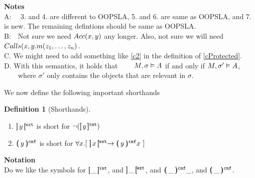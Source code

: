 \documentclass[11pt]{article} %
\theoremstyle{definition}
\newtheorem{definition}{Definition}[section]
\begin{document}
\noindent
\textbf{Notes} 
\\
A: \ \ 3. and 4. are different to OOPSLA, 5. and 6. are same as OOPSLA, and 7. is new. The remaining defintions should be same as OOPSLA.
\\
B:\ \  Not sure we need ${Acc(x,y)}$ any longer. 
 Also, not sure we will need ${Calls(x,y.m (z_1, \ldots, z_n)}$. 
\\
C. We might need to add something like \ref{c2}  in the definition of \ref{cProtected}.
\\
 D. With this semantics, it holds that \ \ \ \ $M , \sigma \vDash A$ if and only if $M , \sigma' \vDash A$, \ \ \ \ where $\sigma'$ only contains the objects that are relevant in $\sigma$.
 

 We now define the following  important shorthands
 \begin{definition}[Shorthands]
 ~
 
\begin{enumerate}
\item
$]\!\!]\, y\, [\!\![^{{\texttt{ext}}}$ is short for  $\neg([\!\![ \,y\, ]\!\!]^{{\texttt{int}}})$
\item
${ (\!\!( \, y \, )\!\!)^{{\texttt{cnf}}} }$  is short for ${\all{x}{\ \external x  \rightarrow  {}{\protectedFrom{y} {x}}\ }}$
\end{enumerate}
\end{definition}
 


 
\noindent
\textbf{Notation} 
\\
Do we like the   symbols for $[\!\![ \,\_\, ]\!\!]^{{\texttt{int}}}$, and $]\!\!]\, \_\, [\!\![^{{\texttt{ext}}}$, and $(\!\!(\, \_\, )\!\!)^{{\texttt{cnf}}} \_$, and $ (\!\!( \, \_ \, )\!\!)^{{\texttt{cnf}}} $.
\end{document}
